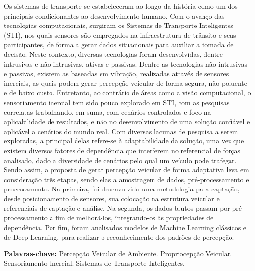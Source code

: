 

\begin{resumo}[Resumo]
    Os sistemas de transporte se estabeleceram ao longo da história como um dos principais condicionantes ao desenvolvimento humano. Com o avanço das tecnologias computacionais, surgiram os Sistemas de Transporte Inteligentes (STI), nos quais sensores são empregados na infraestrutura de trânsito e seus participantes, de forma a gerar dados situacionais para auxiliar a tomada de decisão. Neste contexto, diversas tecnologias foram desenvolvidas, dentre intrusivas e não-intrusivas, ativas e passivas. Dentre as tecnologias não-intrusivas e passivas, existem as baseadas em vibração, realizadas através de sensores inerciais, as quais podem gerar percepção veicular de forma segura, não poluente e de baixo custo. Entretanto, ao contrário de áreas como a visão computacional, o sensoriamento inercial tem sido pouco explorado em STI, com as pesquisas correlatas trabalhando, em suma, com cenários controlados e foco na aplicabilidade de resultados, e não no desenvolvimento de uma solução confiável e aplicável a cenários do mundo real. Com diversas lacunas de pesquisa a serem exploradas, a principal delas refere-se à adaptabilidade da solução, uma vez que existem diversos fatores de dependência que interferem no referencial de forças analisado, dado a diversidade de cenários pelo qual um veículo pode trafegar. Sendo assim, a proposta de gerar percepção veicular de forma adaptativa leva em consideração três etapas, sendo elas a amostragem de dados, pré-processamento e processamento. Na primeira, foi desenvolvido uma metodologia para captação, desde posicionamento de sensores, sua colocação na estrutura veicular e referenciais de captação e análise. Na segunda, os dados brutos passam por pré-processamento a fim de melhorá-los, integrando-os às propriedades de dependência. Por fim, foram analisados modelos de Machine Learning clássicos e de Deep Learning, para realizar o reconhecimento dos padrões de percepção.
    
  \vspace{\baselineskip} 
  \textbf{Palavras-chave:} 
  Percepção Veicular de Ambiente. 
  Propriocepção Veicular. 
  Sensoriamento Inercial. 
  Sistemas de Transporte Inteligentes.
  
\end{resumo}
